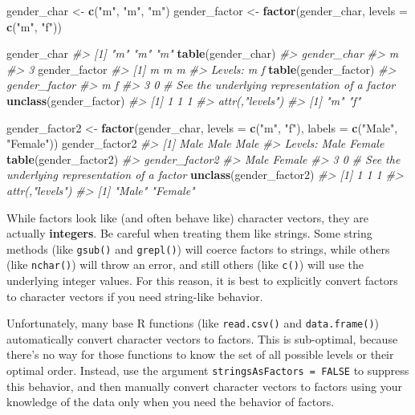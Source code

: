 \documentclass[]{book}
\newenvironment{Shaded}{\begin{snugshade}}{\end{snugshade}}
\newcommand{\CommentTok}[1]{\textcolor[rgb]{0.56,0.35,0.01}{\textit{#1}}}
\newcommand{\DataTypeTok}[1]{\textcolor[rgb]{0.13,0.29,0.53}{#1}}
\newcommand{\KeywordTok}[1]{\textcolor[rgb]{0.13,0.29,0.53}{\textbf{#1}}}
\newcommand{\NormalTok}[1]{#1}
\newcommand{\StringTok}[1]{\textcolor[rgb]{0.31,0.60,0.02}{#1}}
\theoremstyle{definition}
\theoremstyle{definition}
\theoremstyle{definition}
\theoremstyle{remark}
\begin{document}
\begin{Shaded}
\begin{Highlighting}[]
\NormalTok{gender_char <-}\StringTok{ }\KeywordTok{c}\NormalTok{(}\StringTok{"m"}\NormalTok{, }\StringTok{"m"}\NormalTok{, }\StringTok{"m"}\NormalTok{)}
\NormalTok{gender_factor <-}\StringTok{ }\KeywordTok{factor}\NormalTok{(gender_char, }\DataTypeTok{levels =} \KeywordTok{c}\NormalTok{(}\StringTok{"m"}\NormalTok{, }\StringTok{"f"}\NormalTok{))}

\NormalTok{gender_char}
\CommentTok{#> [1] "m" "m" "m"}
\KeywordTok{table}\NormalTok{(gender_char)}
\CommentTok{#> gender_char}
\CommentTok{#> m }
\CommentTok{#> 3}
\NormalTok{gender_factor}
\CommentTok{#> [1] m m m}
\CommentTok{#> Levels: m f}
\KeywordTok{table}\NormalTok{(gender_factor)}
\CommentTok{#> gender_factor}
\CommentTok{#> m f }
\CommentTok{#> 3 0}
\CommentTok{# See the underlying representation of a factor}
\KeywordTok{unclass}\NormalTok{(gender_factor)}
\CommentTok{#> [1] 1 1 1}
\CommentTok{#> attr(,"levels")}
\CommentTok{#> [1] "m" "f"}

\NormalTok{gender_factor2 <-}\StringTok{ }\KeywordTok{factor}\NormalTok{(gender_char, }\DataTypeTok{levels =} \KeywordTok{c}\NormalTok{(}\StringTok{"m"}\NormalTok{, }\StringTok{"f"}\NormalTok{), }\DataTypeTok{labels =} \KeywordTok{c}\NormalTok{(}\StringTok{"Male"}\NormalTok{, }\StringTok{"Female"}\NormalTok{))}
\NormalTok{gender_factor2}
\CommentTok{#> [1] Male Male Male}
\CommentTok{#> Levels: Male Female}
\KeywordTok{table}\NormalTok{(gender_factor2)}
\CommentTok{#> gender_factor2}
\CommentTok{#>   Male Female }
\CommentTok{#>      3      0}
\CommentTok{# See the underlying representation of a factor}
\KeywordTok{unclass}\NormalTok{(gender_factor2)}
\CommentTok{#> [1] 1 1 1}
\CommentTok{#> attr(,"levels")}
\CommentTok{#> [1] "Male"   "Female"}
\end{Highlighting}
\end{Shaded}

While factors look like (and often behave like) character vectors, they
are actually \textbf{integers}. Be careful when treating them like
strings. Some string methods (like \texttt{gsub()} and \texttt{grepl()})
will coerce factors to strings, while others (like \texttt{nchar()})
will throw an error, and still others (like \texttt{c()}) will use the
underlying integer values. For this reason, it is best to explicitly
convert factors to character vectors if you need string-like behavior.

Unfortunately, many base R functions (like \texttt{read.csv()} and
\texttt{data.frame()}) automatically convert character vectors to
factors. This is sub-optimal, because there's no way for those functions
to know the set of all possible levels or their optimal order. Instead,
use the argument \texttt{stringsAsFactors\ =\ FALSE} to suppress this
behavior, and then manually convert character vectors to factors using
your knowledge of the data only when you need the behavior of factors.
\end{document}
